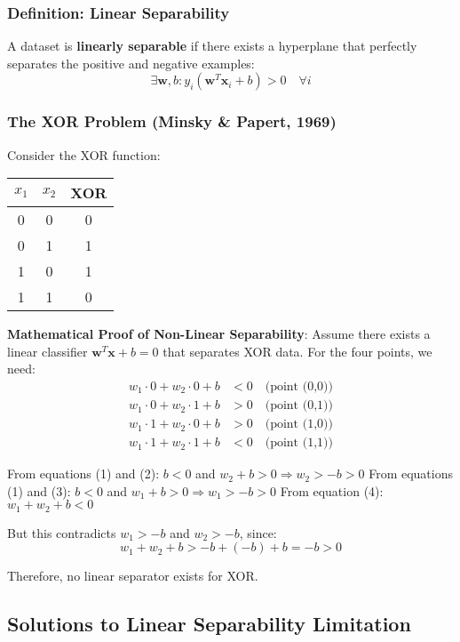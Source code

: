 \subsubsection{Definition: Linear Separability}
A dataset is \textbf{linearly separable} if there exists a hyperplane that perfectly separates the positive and negative examples:
\[\exists \mathbf{w}, b : y_i(\mathbf{w}^T \mathbf{x}_i + b) > 0 \quad \forall i\]

\subsubsection{The XOR Problem (Minsky \& Papert, 1969)}
Consider the XOR function:
\begin{center}
\begin{tabular}{|c|c|c|}
\hline
\(x_1\) & \(x_2\) & XOR \\
\hline
0 & 0 & 0 \\
0 & 1 & 1 \\
1 & 0 & 1 \\
1 & 1 & 0 \\
\hline
\end{tabular}
\end{center}

\textbf{Mathematical Proof of Non-Linear Separability}:
Assume there exists a linear classifier \(\mathbf{w}^T \mathbf{x} + b = 0\) that separates XOR data.
For the four points, we need:
\begin{align}
w_1 \cdot 0 + w_2 \cdot 0 + b &< 0 \quad \text{(point (0,0))} \\
w_1 \cdot 0 + w_2 \cdot 1 + b &> 0 \quad \text{(point (0,1))} \\
w_1 \cdot 1 + w_2 \cdot 0 + b &> 0 \quad \text{(point (1,0))} \\
w_1 \cdot 1 + w_2 \cdot 1 + b &< 0 \quad \text{(point (1,1))}
\end{align}

From equations (1) and (2): \(b < 0\) and \(w_2 + b > 0 \Rightarrow w_2 > -b > 0\)
From equations (1) and (3): \(b < 0\) and \(w_1 + b > 0 \Rightarrow w_1 > -b > 0\)
From equation (4): \(w_1 + w_2 + b < 0\)

But this contradicts \(w_1 > -b\) and \(w_2 > -b\), since:
\[w_1 + w_2 + b > -b + (-b) + b = -b > 0\]

Therefore, no linear separator exists for XOR.

\subsection{Solutions to Linear Separability Limitation}
